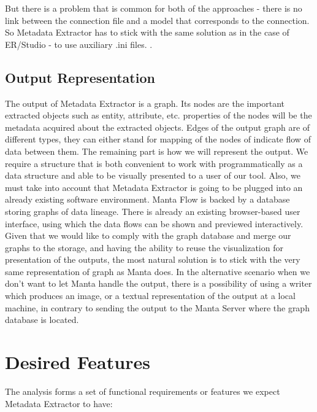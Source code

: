 But there is a problem that is common for both of the approaches -  there is no link between the connection file and a model that corresponds to the connection. 
So Metadata Extractor has to stick with the same solution as in the case of ER/Studio - to use auxiliary .ini files. .

\subsection{Output Representation}

The output of Metadata Extractor is a graph. Its nodes are the important extracted objects such as entity, attribute, etc. properties of the nodes will be the metadata acquired about the extracted objects. Edges of the output graph are of different types, they can either stand for mapping of the nodes of indicate flow of data between them. 
The remaining part is how we will represent the output. We require a structure that is both convenient to work with programmatically as a data structure and able to be visually presented to a user of our tool.
Also, we must take into account that Metadata Extractor is going to be plugged into an already existing software environment. 
Manta Flow is backed by a database storing graphs of data lineage. There is already an existing browser-based user interface, using which the data flows can be shown and previewed interactively. 
Given that we would like to comply with the graph database and merge our graphs to the storage, and having the ability to reuse the visualization for presentation of the outputs, the most natural solution is to stick with the very same representation of graph as Manta does.
In the alternative scenario when we don't want to let Manta handle the output, there is a possibility of using a writer which produces an image, or a textual representation of the output at a local machine, in contrary to sending the output to the Manta Server where the graph database is located.

\section{Desired Features}

The analysis forms a set of functional requirements or features we expect Metadata Extractor to have:

